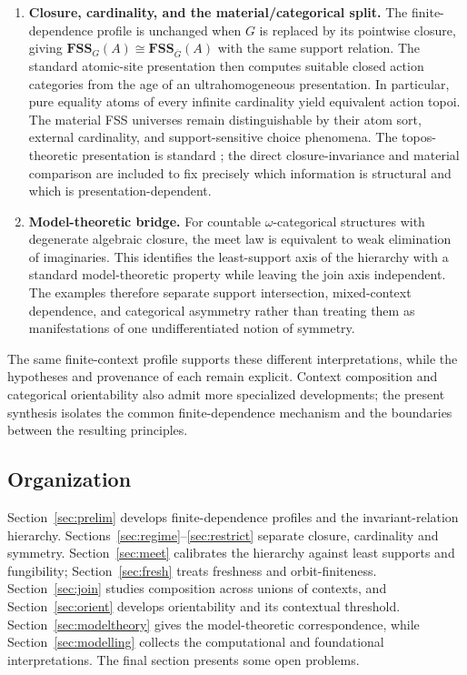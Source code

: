 \documentclass{lmcs}
\newcommand{\FSS}{\mathbf{FSS}}
\begin{document}
\begin{enumerate}[label=\textup{(\arabic*)},leftmargin=2.4em,itemsep=.45em]
\item \textbf{Closure, cardinality, and the material/categorical split.}
The finite-dependence profile is unchanged when $G$ is replaced by its
pointwise closure, giving
$\FSS_G(A)\cong\FSS_{\overline G}(A)$ with the same support relation. The
standard atomic-site presentation then computes suitable closed action
categories from the age of an ultrahomogeneous presentation. In particular,
pure equality atoms of every infinite cardinality yield equivalent action
topoi. The material FSS universes remain distinguishable by their atom sort,
external cardinality, and support-sensitive choice phenomena. The
topos-theoretic presentation is standard
\cite{MacLaneMoerdijk,Caramello16}; the direct closure-invariance and material
comparison are included to fix precisely which information is structural and
which is presentation-dependent.

\item \textbf{Model-theoretic bridge.}
For countable $\omega$-categorical structures with degenerate algebraic
closure, the meet law is equivalent to weak elimination of imaginaries.
This identifies the least-support axis of the hierarchy with a standard
model-theoretic property while leaving the join axis independent. The
examples therefore separate support intersection, mixed-context dependence,
and categorical asymmetry rather than treating them as manifestations of one
undifferentiated notion of symmetry.
\end{enumerate}

The same finite-context profile supports these different interpretations, while the hypotheses and provenance of each remain explicit. Context composition and categorical orientability also admit more specialized developments; the present synthesis isolates the common finite-dependence mechanism and the boundaries between the resulting principles.

\subsection{Organization}
Section~\ref{sec:prelim} develops finite-dependence profiles and the
invariant-relation hierarchy. Sections~\ref{sec:regime}--\ref{sec:restrict} separate closure, cardinality and symmetry. Section~\ref{sec:meet}
calibrates the hierarchy against least supports and fungibility;
Section~\ref{sec:fresh} treats freshness and orbit-finiteness.
Section~\ref{sec:join} studies composition across unions of contexts, and Section~\ref{sec:orient} develops orientability and its contextual
threshold. Section~\ref{sec:modeltheory} gives the model-theoretic
correspondence, while Section~\ref{sec:modelling} collects the computational and foundational interpretations. The final section presents some open problems.
\end{document}
